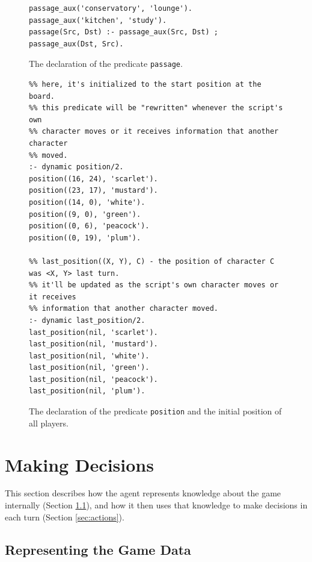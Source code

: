 \documentclass[12pt,a4paper]{article}
\newcommand{\varname}[1]{\texttt{#1}}
\newcommand{\predname}[1]{{\color{MidnightBlue}\varname{#1}}}
\begin{document}
\begin{figure}[H]
	\centering
\begin{lstlisting}[style=Prolog-pygsty]
%% passage(Src, Dst) - there's a passage from Src to Dst
passage_aux('conservatory', 'lounge').
passage_aux('kitchen', 'study').
passage(Src, Dst) :- passage_aux(Src, Dst) ; passage_aux(Dst, Src).
\end{lstlisting}
	\caption{The declaration of the predicate \predname{passage}.} 
	\label{fig:passage}
\end{figure}

\begin{figure}[H]
	\centering
\begin{lstlisting}[style=Prolog-pygsty]
%% position((X, Y), C) - the current position of character C is <X, Y>
%% here, it's initialized to the start position at the board.
%% this predicate will be "rewritten" whenever the script's own
%% character moves or it receives information that another character
%% moved.
:- dynamic position/2.
position((16, 24), 'scarlet').
position((23, 17), 'mustard').
position((14, 0), 'white').
position((9, 0), 'green').
position((0, 6), 'peacock').
position((0, 19), 'plum').

%% last_position((X, Y), C) - the position of character C was <X, Y> last turn.
%% it'll be updated as the script's own character moves or it receives
%% information that another character moved.
:- dynamic last_position/2.
last_position(nil, 'scarlet').
last_position(nil, 'mustard').
last_position(nil, 'white').
last_position(nil, 'green').
last_position(nil, 'peacock').
last_position(nil, 'plum').
\end{lstlisting}
	\caption{The declaration of the predicate \predname{position} and the initial position of all players.} 
	\label{fig:start-positions}
\end{figure}

\section{Making Decisions}
\label{sec:decisions}

This section describes how the agent represents knowledge about the game internally (Section \ref{sec:data}), and how it then uses that knowledge to make decisions in each turn (Section \ref{sec:actions}).

\subsection{Representing the Game Data}
\label{sec:data}
\end{document}
